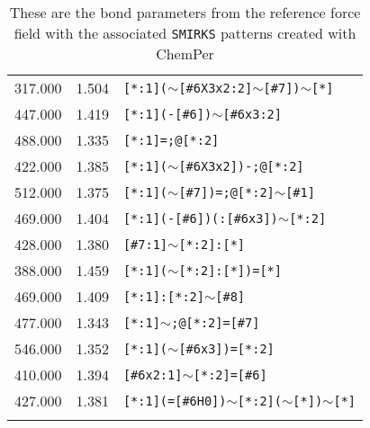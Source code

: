 \begin{longtable}{>{\baselineskip=10pt}p{} >{\baselineskip=10pt}p{} >{\baselineskip=10pt}p{}}
317.000 & 1.504 & \texttt{[*:1]($\sim$[\#6X3x2:2]$\sim$[\#7])$\sim$[*]} \\ 
447.000 & 1.419 & \texttt{[*:1](-[\#6])$\sim$[\#6x3:2]} \\ 
488.000 & 1.335 & \texttt{[*:1]=;@[*:2]} \\ 
422.000 & 1.385 & \texttt{[*:1]($\sim$[\#6X3x2])-;@[*:2]} \\ 
512.000 & 1.375 & \texttt{[*:1]($\sim$[\#7])=;@[*:2]$\sim$[\#1]} \\ 
469.000 & 1.404 & \texttt{[*:1](-[\#6])(:[\#6x3])$\sim$[*:2]} \\ 
428.000 & 1.380 & \texttt{[\#7:1]$\sim$[*:2]:[*]} \\ 
388.000 & 1.459 & \texttt{[*:1]($\sim$[*:2]:[*])=[*]} \\ 
469.000 & 1.409 & \texttt{[*:1]:[*:2]$\sim$[\#8]} \\ 
477.000 & 1.343 & \texttt{[*:1]$\sim$;@[*:2]=[\#7]} \\ 
546.000 & 1.352 & \texttt{[*:1]($\sim$[\#6x3])=[*:2]} \\ 
410.000 & 1.394 & \texttt{[\#6x2:1]$\sim$[*:2]=[\#6]} \\ 
427.000 & 1.381 & \texttt{[*:1](=[\#6H0])$\sim$[*:2]($\sim$[*])$\sim$[*]} \\ 
\hline\caption{These are the bond parameters from the reference force field with the associated \texttt{SMIRKS} patterns created with ChemPer} 
\label{tab:protein_bond}
\end{longtable}


